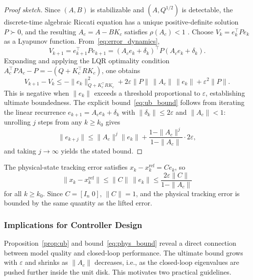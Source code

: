 \documentclass[journal]{IEEEtran}
\begin{document}
\begin{proof}[Proof sketch]
Since $(A,B)$ is stabilizable and $(A,Q^{1/2})$ is detectable, the discrete-time algebraic Riccati equation has a unique positive-definite solution $P \succ 0$, and the resulting $A_c = A - BK_c$ satisfies $\rho(A_c) < 1$ \cite{korda2018linear}. Choose $V_k = e_k^\top P e_k$ as a Lyapunov function. From~\eqref{eq:error_dynamics},
\begin{equation}
    V_{k+1} = e_{k+1}^\top P e_{k+1} = (A_c e_k + \delta_k)^\top P (A_c e_k + \delta_k).
\end{equation}
Expanding and applying the LQR optimality condition $A_c^\top P A_c - P = -(Q + K_c^\top R K_c)$, one obtains
\begin{equation}
    V_{k+1} - V_k \leq -\|e_k\|_{Q+K_c^\top R K_c}^2 + 2\varepsilon \|P\|\,\|A_c\|\,\|e_k\| + \varepsilon^2 \|P\|.
\end{equation}
This is negative when $\|e_k\|$ exceeds a threshold proportional to $\varepsilon$, establishing ultimate boundedness. The explicit bound~\eqref{eq:ub_bound} follows from iterating the linear recurrence $e_{k+1} = A_c e_k + \delta_k$ with $\|\delta_k\| \leq 2\varepsilon$ and $\|A_c\| < 1$: unrolling $j$ steps from any $k \geq k_0$ gives
\begin{equation}
    \|e_{k+j}\| \leq \|A_c\|^j \|e_k\| + \frac{1 - \|A_c\|^j}{1 - \|A_c\|}\cdot 2\varepsilon,
\end{equation}
and taking $j\to\infty$ yields the stated bound.
\end{proof}

The physical-state tracking error satisfies $x_k - x_k^{\mathrm{ref}} = Ce_k$, so
\begin{equation}
    \|x_k - x_k^{\mathrm{ref}}\| \leq \|C\|\,\|e_k\| \leq \frac{2\varepsilon\|C\|}{1-\|A_c\|}
    \label{eq:phys_bound}
\end{equation}
for all $k \geq k_0$. Since $C = [I_n\;0]$, $\|C\| = 1$, and the physical tracking error is bounded by the same quantity as the lifted error.

\subsubsection{Implications for Controller Design}

Proposition~\ref{prop:ub} and bound~\eqref{eq:phys_bound} reveal a direct connection between model quality and closed-loop performance. The ultimate bound grows with $\varepsilon$ and shrinks as $\|A_c\|$ decreases, i.e., as the closed-loop eigenvalues are pushed further inside the unit disk. This motivates two practical guidelines.
\end{document}
